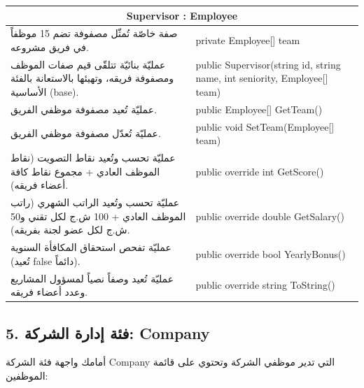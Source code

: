 \documentclass[14pt]{extarticle}
\begin{document}
\begin{center}
\renewcommand{\arraystretch}{1.5}
{\small
\begin{tabular}{|p{}|p{}|}
\hline
\multicolumn{2}{|c|}{\textbf{\textenglish{Supervisor : Employee}}} \\
\hline
صفة خاصّة تُمثّل مصفوفة تضم 15 موظفاً في فريق مشروعه. & \textenglish{private Employee[] team} \\
\hline
عمليّة بنائيّة تتلقّى قيم صفات الموظف ومصفوفة فريقه، وتهيئها بالاستعانة بالفئة الأساسية (\textenglish{base}). & \textenglish{public Supervisor(string id, string name, int seniority, Employee[] team)} \\
\hline
عمليّة تُعيد مصفوفة موظفي الفريق. & \textenglish{public Employee[] GetTeam()} \\
\hline
عمليّة تُعدّل مصفوفة موظفي الفريق. & \textenglish{public void SetTeam(Employee[] team)} \\
\hline
عمليّة تحسب وتُعيد نقاط التصويت (نقاط الموظف العادي + مجموع نقاط كافة أعضاء فريقه). & \textenglish{public override int GetScore()} \\
\hline
عمليّة تحسب وتُعيد الراتب الشهري (راتب الموظف العادي + 100 ش.ج لكل تقني و50 ش.ج لكل عضو لجنة بفريقه). & \textenglish{public override double GetSalary()} \\
\hline
عمليّة تفحص استحقاق المكافأة السنوية (تُعيد \textenglish{false} دائماً). & \textenglish{public override bool YearlyBonus()} \\
\hline
عمليّة تُعيد وصفاً نصياً لمسؤول المشاريع وعدد أعضاء فريقه. & \textenglish{public override string ToString()} \\
\hline
\end{tabular}
}
\end{center}

\clearpage

\subsection*{5. فئة إدارة الشركة: \textenglish{Company}}
أمامك واجهة فئة الشركة \textenglish{Company} التي تدير موظفي الشركة وتحتوي على قائمة الموظفين:
\end{document}
